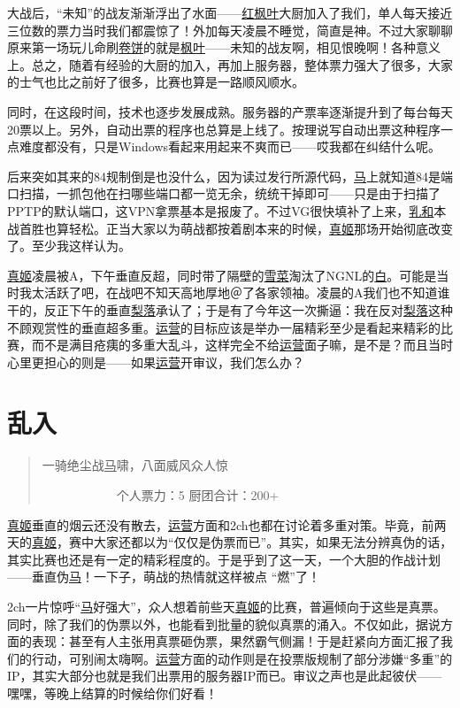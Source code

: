 大战后，“未知”的战友渐渐浮出了水面——\uline{红枫叶}大厨加入了我们，单人每天接近三位数的票力当时我们都震惊了！外加每天凌晨不睡觉，简直是神。不过大家聊聊原来第一场玩儿命刷\uline{卷饼}的就是\uline{枫叶}——未知的战友啊，相见恨晚啊！各种意义上。总之，随着有经验的大厨的加入，再加上服务器，整体票力强大了很多，大家的士气也比之前好了很多，比赛也算是一路顺风顺水。

同时，在这段时间，技术也逐步发展成熟。服务器的产票率逐渐提升到了每台每天20票以上。另外，自动出票的程序也总算是上线了。按理说写自动出票这种程序一点难度都没有，只是Windows看起来用起来不爽而已——哎我都在纠结什么呢。

后来突如其来的84规制倒是也没什么，因为读过发行所源代码，\uline{马}上就知道84是端口扫描，一抓包他在扫哪些端口都一览无余，统统干掉即可——只是由于扫描了PPTP的默认端口，这VPN拿票基本是报废了。不过VG很快填补了上来，\uline{乳和}本战首胜也算轻松。正当大家以为萌战都按着剧本来的时候，\uline{真姬}那场开始彻底改变了。至少我这样认为。

\uline{真姬}凌晨被A，下午垂直反超，同时带了隔壁的\uline{雪菜}淘汰了NGNL的\uline{白}。可能是当时我太活跃了吧，在战吧不知天高地厚地＠了各家领袖。凌晨的A我们也不知道谁干的，反正下午的垂直\uline{梨落}承认了；于是有了今年这一次撕逼：我在反对\uline{梨落}这种不顾观赏性的垂直超多重。\uline{运营}的目标应该是举办一届精彩至少是看起来精彩的比赛，而不是满目疮痍的多重大乱斗，这样完全不给\uline{运营}面子嘛，是不是？而且当时心里更担心的则是——如果\uline{运营}开审议，我们怎么办？

\chapter{乱入}
\begin{quote}
一骑绝尘战\uline{马}啸，八面威风众人惊

　　　　　　个人票力：5 厨团合计：200+
\end{quote}

\uline{真姬}垂直的烟云还没有散去，\uline{运营}方面和2ch也都在讨论着多重对策。毕竟，前两天的\uline{真姬}，赛中大家还都以为“仅仅是伪票而已”。其实，如果无法分辨真伪的话，其实比赛也还是有一定的精彩程度的。于是乎到了这一天，一个大胆的作战计划——垂直伪\uline{马}！一下子，萌战的热情就这样被点 “燃”了！

2ch一片惊呼“\uline{马}好强大”，众人想着前些天\uline{真姬}的比赛，普遍倾向于这些是真票。同时，除了我们的伪票以外，也能看到批量的貌似真票的涌入。不仅如此，据说方面的表现：甚至有人主张用真票砸伪票，果然霸气侧漏！于是赶紧向方面汇报了我们的行动，可别闹太嗨啊。\uline{运营}方面的动作则是在投票版规制了部分涉嫌“多重”的IP，其实大部分也就是我们出票用的服务器IP而已。审议之声也是此起彼伏——嘿嘿，等晚上结算的时候给你们好看！

